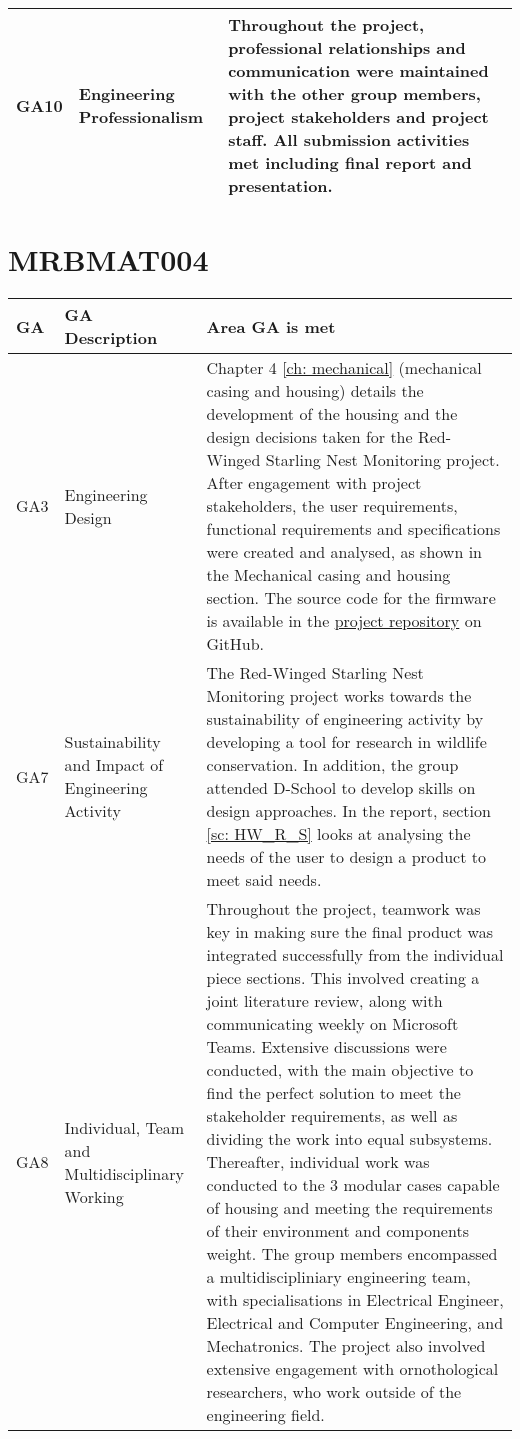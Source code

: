 \documentclass[class=report,11pt,crop=false]{standalone}
\begin{document}
\begin{tabularx}{\textwidth}{|p{} p{} X|}
    GA10 & Engineering Professionalism & Throughout the project, professional relationships and communication were maintained with the other group members, project stakeholders and project staff. All submission activities met including final report and presentation. \\ \hline


\end{tabularx}
\raggedright




\section{MRBMAT004}

\centering
\begin{tabularx}{\textwidth}{|p{} p{} X|}

    \hline
    \textbf{GA} & \textbf{GA Description} & \textbf{Area GA is met} \\ \hline

    GA3 & Engineering Design & Chapter 4  \ref{ch: mechanical} (mechanical casing and housing) details the development of the housing and the design decisions taken for the Red-Winged Starling Nest Monitoring project. After engagement with project stakeholders, the user requirements, functional requirements and specifications were created and analysed, as shown in the Mechanical casing and housing section.   The source code for the firmware is available in the \href{https://github.com/rothdu/EEE4113F-Group13-2024}{project repository} on GitHub.   \\ \hline

    GA7 & Sustainability and Impact of Engineering Activity & The Red-Winged Starling Nest Monitoring project works towards the sustainability of engineering activity by developing a tool for research in wildlife conservation.  In addition, the group attended D-School to develop skills on design approaches. In the report, section \ref{sc: HW_R_S} looks at analysing the needs of the user to design a product to meet said needs. \\ \hline

    GA8 & Individual, Team and Multidisciplinary Working & Throughout the project, teamwork was key in making sure the final product was integrated successfully from the individual piece sections. This involved creating a joint literature review, along with communicating weekly on Microsoft Teams. Extensive discussions were conducted, with the main objective to find the perfect solution to meet the stakeholder requirements, as well as dividing the work into equal subsystems. Thereafter, individual work was conducted to the 3 modular cases capable of housing and meeting the requirements of their environment and components weight. The group members encompassed a multidiscipliniary engineering team, with specialisations in Electrical Engineer, Electrical and Computer Engineering, and Mechatronics. The project also involved extensive engagement with ornothological researchers, who work outside of the engineering field. \\ \hline


\end{tabularx}
\end{document}
